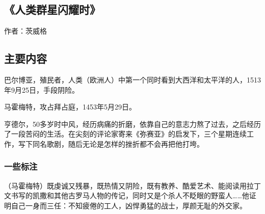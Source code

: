 \subsection{《人类群星闪耀时》}
作者：茨威格

\subsection{主要内容}
\begin{itemize*}
	\item 巴尔博亚，殖民者，人类（欧洲人）中第一个同时看到大西洋和太平洋的人，1513年9月25日，手段阴险。
	\item 马霍梅特，攻占拜占庭，1453年5月29日。
	\item 亨德尔，50多岁时中风，经历病痛的折磨，依靠自己的意志力熬了过去，之后经历了一段苦闷的生活。在尖刻的评论家寄来《弥赛亚》的启发下，三个星期连续工作，写下同名歌剧，随后无论是怎样的挫折都不会再把他打垮。
	
\end{itemize*}

\subsubsection{一些标注}

（马霍梅特）既虔诚又残暴，既热情又阴险，既有教养、酷爱艺术、能阅读用拉丁文书写的凯撒和其他古罗马人物的传记，同时又是个杀人不眨眼的野蛮人……他证明自己一身而三任：不知疲倦的工人，凶悍勇猛的战士，厚颜无耻的外交家。
